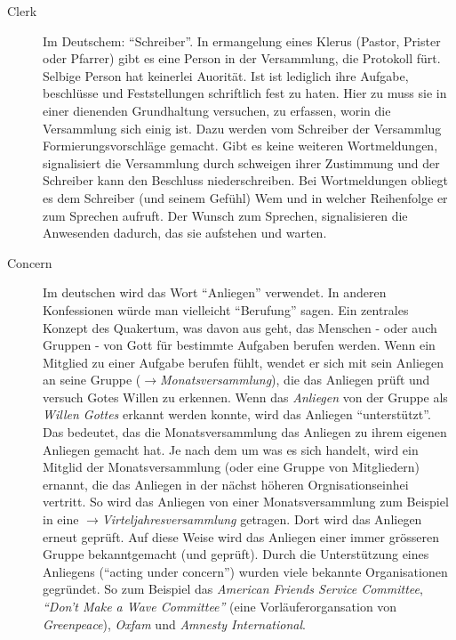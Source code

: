 \begin{description}
 \item[Clerk] Im Deutschem: "`Schreiber"'. In ermangelung eines Klerus (Pastor,
Prister oder Pfarrer) gibt es eine Person in der Versammlung, die Protokoll
fürt. Selbige Person hat keinerlei Auorität. Ist ist lediglich ihre Aufgabe,
beschlüsse und Feststellungen schriftlich fest zu haten. Hier zu muss sie in
einer dienenden Grundhaltung versuchen, zu erfassen, worin die Versammlung sich
einig ist. Dazu werden vom Schreiber der Versammlug Formierungsvorschläge
gemacht. Gibt es keine weiteren Wortmeldungen, signalisiert die Versammlung
durch schweigen ihrer Zustimmung und der Schreiber kann den Beschluss
niederschreiben. Bei Wortmeldungen obliegt es dem Schreiber (und seinem Gefühl)
Wem und in welcher Reihenfolge er zum Sprechen aufruft. Der Wunsch zum Sprechen,
signalisieren die Anwesenden dadurch, das sie aufstehen und warten.

\item[Concern] Im deutschen wird das Wort ``Anliegen'' verwendet. In anderen Konfessionen würde man vielleicht ``Berufung'' sagen. Ein zentrales Konzept des Quakertum, was davon aus geht, das Menschen - oder auch Gruppen -  von Gott für bestimmte Aufgaben berufen werden. Wenn ein Mitglied zu einer Aufgabe berufen fühlt, wendet er sich mit sein Anliegen an seine Gruppe ($\to$\textit{Monatsversammlung}), die das Anliegen prüft und versuch Gotes Willen zu erkennen. Wenn das \textit{Anliegen} von der Gruppe als \textit{Willen Gottes} erkannt werden konnte, wird das Anliegen ``unterstützt''. Das bedeutet, das die Monatsversammlung das Anliegen zu ihrem eigenen Anliegen gemacht hat. Je nach dem um was es sich handelt, wird ein Mitglid der Monatsversammlung (oder eine Gruppe von Mitgliedern) ernannt, die das Anliegen in der nächst höheren Orgnisationseinhei vertritt. So wird das Anliegen von einer Monatsversammlung zum Beispiel in eine $\to$\textit{Virteljahresversammlung} getragen. Dort wird das Anliegen erneut geprüft. Auf diese Weise wird das Anliegen einer immer grösseren Gruppe bekanntgemacht (und geprüft). Durch die Unterstützung eines Anliegens ("`acting under concern"') wurden viele bekannte Organisationen gegründet. So zum Beispiel das \textit{American Friends Service Committee}, \textit{``Don't Make a Wave Committee''} (eine Vorläuferorgansation von \textit{Greenpeace}), \textit{Oxfam} und \textit{Amnesty International}. 



\end{description}
